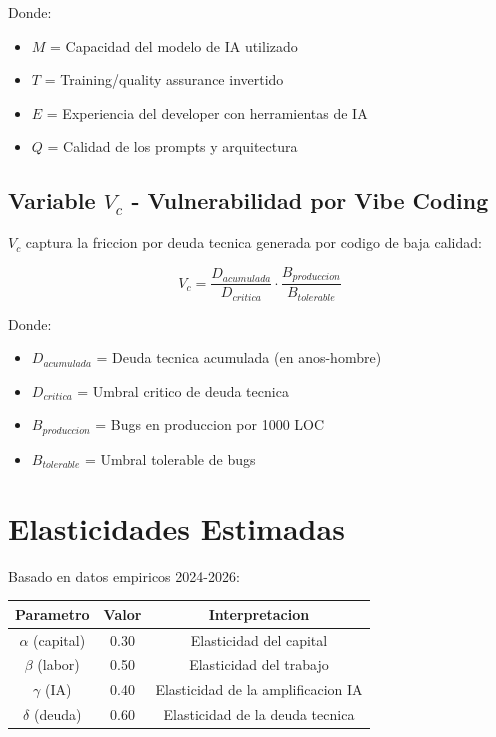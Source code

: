 \documentclass{article}
\begin{document}
Donde:
\begin{itemize}
    \item $M$ = Capacidad del modelo de IA utilizado
    \item $T$ = Training/quality assurance invertido
    \item $E$ = Experiencia del developer con herramientas de IA
    \item $Q$ = Calidad de los prompts y arquitectura
\end{itemize}

\subsection{Variable $V_c$ - Vulnerabilidad por Vibe Coding}

$V_c$ captura la friccion por deuda tecnica generada por codigo de baja calidad:

\begin{equation}
V_c = \frac{D_{acumulada}}{D_{critica}} \cdot \frac{B_{produccion}}{B_{tolerable}}
\end{equation}

Donde:
\begin{itemize}
    \item $D_{acumulada}$ = Deuda tecnica acumulada (en anos-hombre)
    \item $D_{critica}$ = Umbral critico de deuda tecnica
    \item $B_{produccion}$ = Bugs en produccion por 1000 LOC
    \item $B_{tolerable}$ = Umbral tolerable de bugs
\end{itemize}

\section{Elasticidades Estimadas}

Basado en datos empiricos 2024-2026:

\begin{table}[h]
\centering
\begin{tabular}{|c|c|c|}
\hline
\textbf{Parametro} & \textbf{Valor} & \textbf{Interpretacion} \\
\hline
$\alpha$ (capital) & 0.30 & Elasticidad del capital \\
$\beta$ (labor) & 0.50 & Elasticidad del trabajo \\
$\gamma$ (IA) & 0.40 & Elasticidad de la amplificacion IA \\
$\delta$ (deuda) & 0.60 & Elasticidad de la deuda tecnica \\
\hline
\end{tabular}
\end{table}
\end{document}
